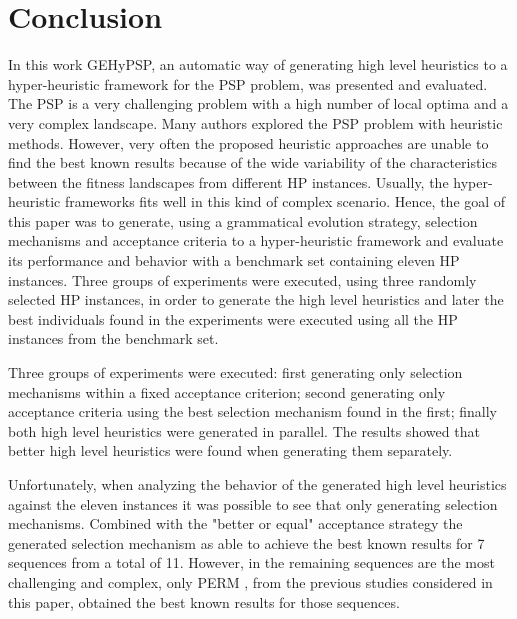 \documentclass[conference]{IEEEtran}
\begin{document}
%
%
%


\section{Conclusion}
\label{sec:conclusion}
In this work  GEHyPSP, an automatic way of generating high level heuristics to a hyper-heuristic framework for the PSP problem, was presented and evaluated. The PSP is a very challenging problem  with a high number of local optima and a very complex landscape. Many authors explored the PSP problem with heuristic methods. 
However, very often the proposed heuristic approaches are unable to find the best known results because of the wide variability of the characteristics between the fitness landscapes from different HP instances. Usually, the hyper-heuristic frameworks fits well in this kind of complex scenario. Hence, the goal of this paper was to generate, using a grammatical evolution strategy, selection mechanisms and acceptance criteria to a hyper-heuristic framework and evaluate its performance and behavior with a benchmark set containing eleven HP instances. Three groups of experiments were executed, using three randomly selected HP instances, in order to generate the high level heuristics and later the best individuals found in the experiments were executed using all the HP instances from the benchmark set. 

Three groups of experiments were executed: first generating only selection mechanisms within a fixed acceptance criterion; second generating only acceptance criteria using the best selection mechanism found in the first; finally both high level heuristics were generated in parallel. The results showed that better high level heuristics were found when generating them separately. 

Unfortunately, when analyzing the behavior of the generated high level heuristics against the eleven instances it was possible to see that only generating selection mechanisms. Combined with the "better or equal" acceptance strategy the generated selection mechanism as able to achieve the best known results for 7 sequences from a total of 11. However, in the remaining sequences are the most challenging and complex, only PERM \cite{hsu2003growth}, from the previous studies considered in this paper,  obtained the best known results for those sequences.
\end{document}
